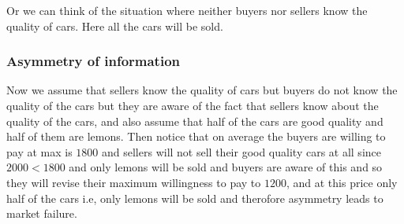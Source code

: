 \documentclass[12pt,a4paper]{article}
\begin{document}
Or we can think of the situation where neither buyers nor sellers know the quality of cars. Here all the cars will be sold.


 \subsubsection*{ Asymmetry of information } 
Now we assume that sellers know the quality of cars but buyers do not know the quality of the cars but they are aware of the fact that sellers know about the quality of the cars, and also assume that half of the cars are good quality and half of them are lemons. Then notice that on average the buyers are willing to pay at max is \(1800\) and sellers will not sell their good quality cars at all since \(2000<1800\)  and only lemons will be sold and buyers are aware of this and so they will revise their maximum willingness to pay to \(1200\),  and at this price only half of the cars i.e, only lemons will be sold and therofore asymmetry leads to market failure.
\end{document}
